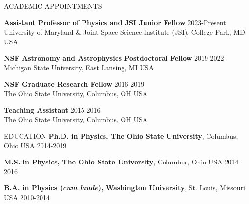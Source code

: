 \documentclass{resume} %
\newenvironment{list1}{
  \begin{list}{\ding{113}}{%
      \setlength{\itemsep}{0in}
      \setlength{\parsep}{0in} \setlength{\parskip}{0in}
      \setlength{\topsep}{0in} \setlength{\partopsep}{0in} 
      \setlength{\leftmargin}{0.17in}}}{\end{list}}
\begin{document}
\begin{rSection}{ACADEMIC APPOINTMENTS}

\textbf{Assistant Professor of Physics and JSI Junior Fellow} \hfill 2023-Present \\ University of Maryland \& Joint Space Science Institute (JSI), College Park, MD USA 

\textbf{NSF Astronomy and Astrophysics Postdoctoral Fellow} \hfill 2019-2022 \\ Michigan State University, East Lansing, MI USA 

\textbf{NSF Graduate Research Fellow} \hfill 2016-2019 \\ The Ohio State University, Columbus, OH USA 

\textbf{Teaching Assistant} \hfill 2015-2016 \\ The Ohio State University, Columbus, OH USA 


\end{rSection}



\begin{rSection}{EDUCATION}
\textbf{Ph.D. in Physics, The Ohio State University}, Columbus, Ohio USA \hfill 2014-2019

\textbf{M.S. in Physics, The Ohio State University}, Columbus, Ohio USA \hfill 2014-2016

\textbf{B.A. in Physics (\textit{cum laude}), Washington University}, St. Louis, Missouri USA \hfill 2010-2014
\end{rSection}


\end{document}
